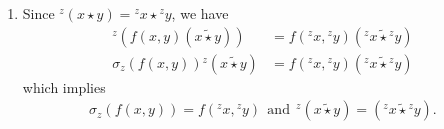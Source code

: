 \documentclass[10 pt,oneside,reqno,a4paper]{amsart}
\numberwithin{equation}{section}
\begin{document}
\begin{enumerate}
\begin{align}
    ~\text{and}~ &((x\widetilde{\star} y) \widetilde {\star} {^yz})\delta(f(x,y), {^yz})  ((y\widetilde{\star} z) \widetilde {\star} {^zx})\delta(f(y,z), {^zx})((z\widetilde{\star} x) \widetilde {\star} {^xy})\delta(f(z,x), {^xy})=1.
\end{align}
 \item Since ${^z(x\star y)}= {^zx} \star {^zy}$, we have 
 \begin{align*}
     {^z(f(x,y)(x\widetilde{\star} y))}&= f({^zx}, {^zy})({^zx} \widetilde{\star} {^zy}) \\
     {\sigma_z(f(x,y))}{^z(x\widetilde{\star} y)}&= f({^zx}, {^zy})({^zx} \widetilde{\star} {^zy})
 \end{align*} 
which implies 
\begin{align}
    \sigma_z(f(x,y))=f({^zx}, {^zy}) ~~\text{and}~~ {^z(x\widetilde{\star} y)}=({^zx} \widetilde{\star} {^zy}).
\end{align}










\end{enumerate}
\end{document}
